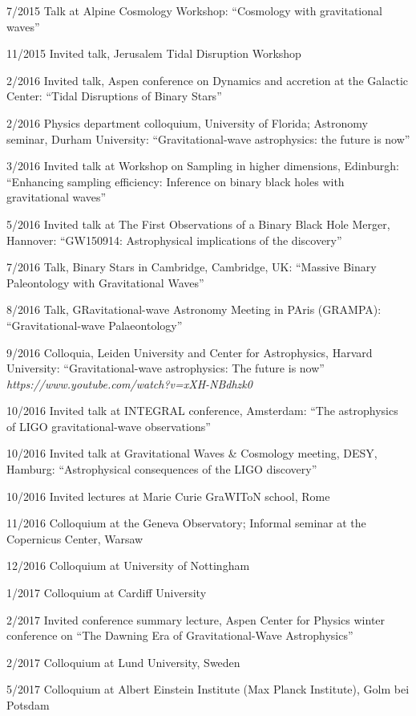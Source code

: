 \documentclass[margin,line]{res}
\begin{document}
\begin{resume}
7/2015	Talk at Alpine Cosmology Workshop: ``Cosmology with gravitational waves''

11/2015	Invited talk, Jerusalem Tidal Disruption Workshop

2/2016 	Invited talk, Aspen conference on Dynamics and accretion at the Galactic Center: ``Tidal Disruptions of Binary Stars''

2/2016	Physics department colloquium, University of Florida;  Astronomy seminar, Durham University: ``Gravitational-wave astrophysics: the future is now''

3/2016	Invited talk at Workshop on Sampling in higher dimensions, Edinburgh: ``Enhancing sampling efficiency: Inference on binary black holes with gravitational waves''

5/2016 	Invited talk at The First Observations of a Binary Black Hole Merger, Hannover: ``GW150914: Astrophysical implications of the discovery''

7/2016	Talk, Binary Stars in Cambridge, Cambridge, UK: ``Massive Binary Paleontology with Gravitational Waves''

8/2016 	Talk, GRavitational-wave Astronomy Meeting in PAris (GRAMPA): ``Gravitational-wave Palaeontology''

9/2016 	Colloquia, Leiden University and Center for Astrophysics, Harvard University: ``Gravitational-wave astrophysics: The future is now'' {\it https://www.youtube.com/watch?v=xXH-NBdhzk0}

10/2016 	Invited talk at INTEGRAL conference, Amsterdam: ``The astrophysics of LIGO gravitational-wave observations''

10/2016 	Invited talk at Gravitational Waves \& Cosmology meeting, DESY, Hamburg:  ``Astrophysical consequences of the LIGO discovery''

10/2016 	Invited lectures at Marie Curie GraWIToN school, Rome

11/2016 	Colloquium at the Geneva Observatory; Informal seminar at the Copernicus Center, Warsaw 

12/2016 	Colloquium at University of Nottingham

1/2017 	Colloquium at Cardiff University

2/2017	Invited conference summary lecture, Aspen Center for Physics winter conference on ``The Dawning Era of Gravitational-Wave Astrophysics''

2/2017	Colloquium at Lund University, Sweden 

5/2017	Colloquium at Albert Einstein Institute (Max Planck Institute), Golm bei Potsdam


\end{resume}
\end{document}
